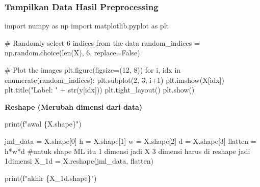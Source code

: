 \documentclass[
  letterpaper,
  DIV=11,
  numbers=noendperiod]{scrreprt}
\newenvironment{Shaded}{\begin{snugshade}}{\end{snugshade}}
\newcommand{\BuiltInTok}[1]{\textcolor[rgb]{0.00,0.23,0.31}{#1}}
\newcommand{\CommentTok}[1]{\textcolor[rgb]{0.37,0.37,0.37}{#1}}
\newcommand{\ControlFlowTok}[1]{\textcolor[rgb]{0.00,0.23,0.31}{#1}}
\newcommand{\DecValTok}[1]{\textcolor[rgb]{0.68,0.00,0.00}{#1}}
\newcommand{\ImportTok}[1]{\textcolor[rgb]{0.00,0.46,0.62}{#1}}
\newcommand{\KeywordTok}[1]{\textcolor[rgb]{0.00,0.23,0.31}{#1}}
\newcommand{\NormalTok}[1]{\textcolor[rgb]{0.00,0.23,0.31}{#1}}
\newcommand{\OperatorTok}[1]{\textcolor[rgb]{0.37,0.37,0.37}{#1}}
\newcommand{\SpecialCharTok}[1]{\textcolor[rgb]{0.37,0.37,0.37}{#1}}
\newcommand{\SpecialStringTok}[1]{\textcolor[rgb]{0.13,0.47,0.30}{#1}}
\newcommand{\StringTok}[1]{\textcolor[rgb]{0.13,0.47,0.30}{#1}}
\newcommand{\VariableTok}[1]{\textcolor[rgb]{0.07,0.07,0.07}{#1}}
\begin{document}
\hypertarget{tampilkan-data-hasil-preprocessing}{%
\subsubsection*{Tampilkan Data Hasil
Preprocessing}\label{tampilkan-data-hasil-preprocessing}}

\begin{Shaded}
\begin{Highlighting}[]
\ImportTok{import}\NormalTok{ numpy }\ImportTok{as}\NormalTok{ np}
\ImportTok{import}\NormalTok{ matplotlib.pyplot }\ImportTok{as}\NormalTok{ plt}

\CommentTok{\# Randomly select 6 indices from the data}
\NormalTok{random\_indices }\OperatorTok{=}\NormalTok{ np.random.choice(}\BuiltInTok{len}\NormalTok{(X), }\DecValTok{6}\NormalTok{, replace}\OperatorTok{=}\VariableTok{False}\NormalTok{)}

\CommentTok{\# Plot the images}
\NormalTok{plt.figure(figsize}\OperatorTok{=}\NormalTok{(}\DecValTok{12}\NormalTok{, }\DecValTok{8}\NormalTok{))}
\ControlFlowTok{for}\NormalTok{ i, idx }\KeywordTok{in} \BuiltInTok{enumerate}\NormalTok{(random\_indices):}
\NormalTok{    plt.subplot(}\DecValTok{2}\NormalTok{, }\DecValTok{3}\NormalTok{, i}\OperatorTok{+}\DecValTok{1}\NormalTok{)}
\NormalTok{    plt.imshow(X[idx])}
\NormalTok{    plt.title(}\StringTok{"Label: "} \OperatorTok{+} \BuiltInTok{str}\NormalTok{(y[idx]))}
\NormalTok{plt.tight\_layout()}
\NormalTok{plt.show()}
\end{Highlighting}
\end{Shaded}

\textbf{Reshape (Merubah dimensi dari data)}

\begin{Shaded}
\begin{Highlighting}[]
\BuiltInTok{print}\NormalTok{(}\SpecialStringTok{f"awal }\SpecialCharTok{\{}\NormalTok{X}\SpecialCharTok{.}\NormalTok{shape}\SpecialCharTok{\}}\SpecialStringTok{"}\NormalTok{)}

\NormalTok{jml\_data }\OperatorTok{=}\NormalTok{ X.shape[}\DecValTok{0}\NormalTok{]}
\NormalTok{h }\OperatorTok{=}\NormalTok{ X.shape[}\DecValTok{1}\NormalTok{]}
\NormalTok{w }\OperatorTok{=}\NormalTok{ X.shape[}\DecValTok{2}\NormalTok{]}
\NormalTok{d }\OperatorTok{=}\NormalTok{ X.shape[}\DecValTok{3}\NormalTok{]}
\NormalTok{flatten  }\OperatorTok{=}\NormalTok{ h}\OperatorTok{*}\NormalTok{w}\OperatorTok{*}\NormalTok{d}
\CommentTok{\#untuk shape ML itu 1 dimensi jadi X 3 dimensi harus di reshape jadi 1dimensi}
\NormalTok{X\_1d }\OperatorTok{=}\NormalTok{ X.reshape(jml\_data, flatten)}

\BuiltInTok{print}\NormalTok{(}\SpecialStringTok{f"akhir }\SpecialCharTok{\{}\NormalTok{X\_1d}\SpecialCharTok{.}\NormalTok{shape}\SpecialCharTok{\}}\SpecialStringTok{"}\NormalTok{)  }
\end{Highlighting}
\end{Shaded}
\end{document}
